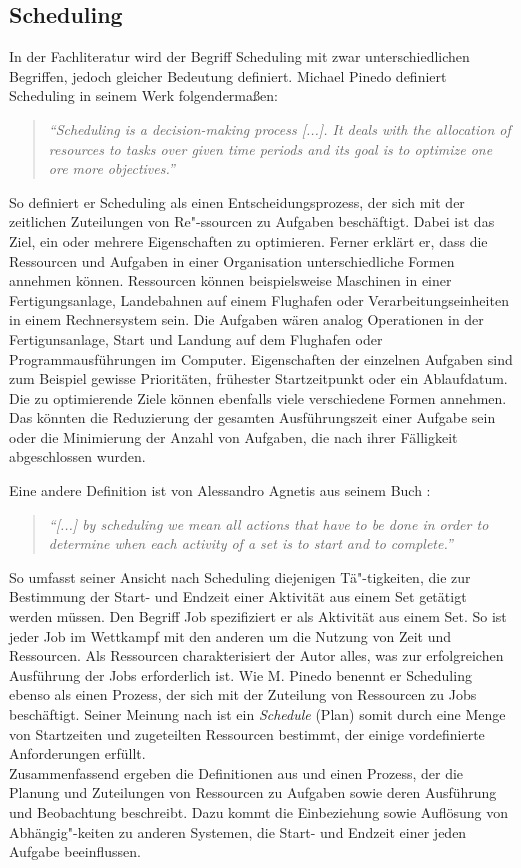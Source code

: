 \subsection{Scheduling}\label{s:scheduling}
In der Fachliteratur wird der Begriff Scheduling mit zwar unterschiedlichen Begriffen, jedoch gleicher Bedeutung definiert. Michael Pinedo definiert Scheduling in seinem Werk \cite{mpinedo} folgendermaßen:
\begin{quote}
\textit{"`Scheduling is a decision-making process [...]. It deals with the allocation of resources to tasks over given time periods and its goal is to optimize one ore more objectives."'}
\end{quote}
So definiert er Scheduling als einen Entscheidungsprozess, der sich mit der zeitlichen Zuteilungen von Re"-ssourcen zu Aufgaben beschäftigt. Dabei ist das Ziel, ein oder mehrere Eigenschaften zu optimieren. Ferner erklärt er, dass die Ressourcen und Aufgaben in einer Organisation unterschiedliche Formen annehmen können. Ressourcen können beispielsweise Maschinen in einer Fertigungsanlage, Landebahnen auf einem Flughafen oder Verarbeitungseinheiten in einem Rechnersystem sein. Die Aufgaben wären analog Operationen in der Fertigunsanlage, Start und Landung auf dem Flughafen oder Programmausführungen im Computer. Eigenschaften der einzelnen Aufgaben sind zum Beispiel gewisse Prioritäten, frühester Startzeitpunkt oder ein Ablaufdatum. Die zu optimierende Ziele können ebenfalls viele verschiedene Formen annehmen. Das könnten die Reduzierung der gesamten Ausführungszeit einer Aufgabe sein oder die Minimierung der Anzahl von Aufgaben, die nach ihrer Fälligkeit abgeschlossen wurden.

Eine andere Definition ist von Alessandro Agnetis aus seinem Buch \cite{aagnetis}:
\begin{quote}
\textit{"`[...] by scheduling we mean all actions that have to be done in order to determine when each activity of a set is to start and to complete."'}
\end{quote}
So umfasst seiner Ansicht nach Scheduling diejenigen Tä"-tigkeiten, die zur Bestimmung der Start- und Endzeit einer Aktivität aus einem Set getätigt werden müssen. Den Begriff Job spezifiziert er als Aktivität aus einem Set. So ist jeder Job im Wettkampf mit den anderen um die Nutzung von Zeit und Ressourcen. Als Ressourcen charakterisiert der Autor alles, was zur erfolgreichen Ausführung der Jobs erforderlich ist. Wie M. Pinedo benennt er Scheduling ebenso als einen Prozess, der sich mit der Zuteilung von Ressourcen zu Jobs beschäftigt. Seiner Meinung nach ist ein \textit{Schedule} (Plan) somit durch eine Menge von Startzeiten und zugeteilten Ressourcen bestimmt, der einige vordefinierte Anforderungen erfüllt.\\
Zusammenfassend ergeben die Definitionen aus \cite{mpinedo} und \cite{aagnetis} einen Prozess, der die Planung und Zuteilungen von Ressourcen zu Aufgaben sowie deren Ausführung und Beobachtung beschreibt. Dazu kommt die Einbeziehung sowie Auflösung von Abhängig"-keiten zu anderen Systemen, die Start- und Endzeit einer jeden Aufgabe beeinflussen.

